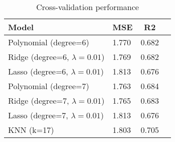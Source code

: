 \begin{table}
\centering
\caption{Cross-validation performance}
\label{tab:cross_validation}
\begin{tabular}{|l|l|c|c|}
\toprule
                           Model &   MSE &    R2 \\
\midrule
           Polynomial (degree=6) & 1.770 & 0.682 \\
Ridge (degree=6, $\lambda=0.01$) & 1.769 & 0.682 \\
Lasso (degree=6, $\lambda=0.01$) & 1.813 & 0.676 \\
           Polynomial (degree=7) & 1.763 & 0.684 \\
Ridge (degree=7, $\lambda=0.01$) & 1.765 & 0.683 \\
Lasso (degree=7, $\lambda=0.01$) & 1.813 & 0.676 \\
                      KNN (k=17) & 1.803 & 0.705 \\
\bottomrule
\end{tabular}
\end{table}
